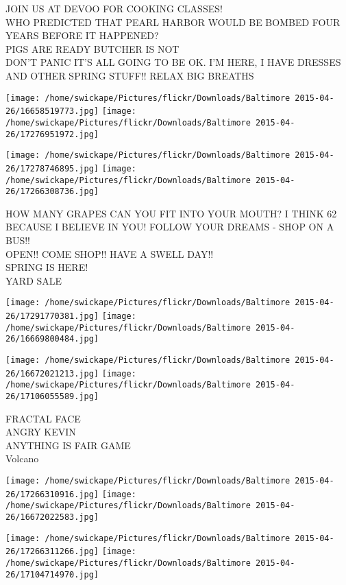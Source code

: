 \documentclass[10pt,letterpaper]{article}
\begin{document}
JOIN US AT DEVOO FOR COOKING CLASSES!\\
WHO PREDICTED THAT PEARL HARBOR WOULD BE BOMBED FOUR YEARS BEFORE IT HAPPENED?\\
PIGS ARE READY BUTCHER IS NOT\\
DON'T PANIC IT'S ALL GOING TO BE OK.  I'M HERE, I HAVE DRESSES AND OTHER SPRING STUFF!!  RELAX BIG BREATHS\\
\pagebreak

\texttt{[image: /home/swickape/Pictures/flickr/Downloads/Baltimore 2015-04-26/16658519773.jpg]}
\texttt{[image: /home/swickape/Pictures/flickr/Downloads/Baltimore 2015-04-26/17276951972.jpg]}

\texttt{[image: /home/swickape/Pictures/flickr/Downloads/Baltimore 2015-04-26/17278746895.jpg]}
\texttt{[image: /home/swickape/Pictures/flickr/Downloads/Baltimore 2015-04-26/17266308736.jpg]}

HOW MANY GRAPES CAN YOU FIT INTO YOUR MOUTH?  I THINK 62 BECAUSE I BELIEVE IN YOU!  FOLLOW YOUR DREAMS {-} SHOP ON A BUS!!\\
OPEN!! COME SHOP!! HAVE A SWELL DAY!!\\
SPRING IS HERE!\\
YARD SALE\\
\pagebreak

\texttt{[image: /home/swickape/Pictures/flickr/Downloads/Baltimore 2015-04-26/17291770381.jpg]}
\texttt{[image: /home/swickape/Pictures/flickr/Downloads/Baltimore 2015-04-26/16669800484.jpg]}

\texttt{[image: /home/swickape/Pictures/flickr/Downloads/Baltimore 2015-04-26/16672021213.jpg]}
\texttt{[image: /home/swickape/Pictures/flickr/Downloads/Baltimore 2015-04-26/17106055589.jpg]}

FRACTAL FACE\\
ANGRY KEVIN\\
ANYTHING IS FAIR GAME\\
Volcano\\
\pagebreak

\texttt{[image: /home/swickape/Pictures/flickr/Downloads/Baltimore 2015-04-26/17266310916.jpg]}
\texttt{[image: /home/swickape/Pictures/flickr/Downloads/Baltimore 2015-04-26/16672022583.jpg]}

\texttt{[image: /home/swickape/Pictures/flickr/Downloads/Baltimore 2015-04-26/17266311266.jpg]}
\texttt{[image: /home/swickape/Pictures/flickr/Downloads/Baltimore 2015-04-26/17104714970.jpg]}
\end{document}
